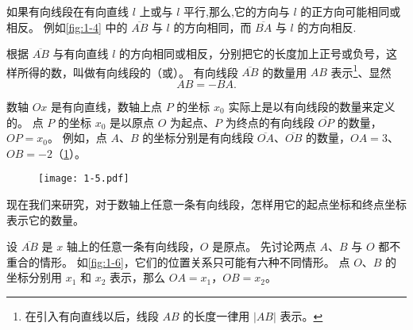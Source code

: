 如果有向线段在有向直线 $l$ 上或与 $l$ 平行,那么,它的方向与 $l$ 的正方向可能相同或相反。
例如\cref{fig:1-4} 中的 $\overline{AB}$ 与 $l$ 的方向相同，而 $\overline{BA}$ 与 $l$ 的方向相反.

根据 $\overline{AB}$ 与有向直线 $l$ 的方向相同或相反，分别把它的长度加上正号或负号，这样所得的数，叫做有向线段的（或）。
有向线段 $\overline{AB}$ 的数量用 $AB$ 表示\footnote{在引入有向直线以后，线段 $AB$ 的长度一律用 $|AB|$ 表示。}、显然
\[AB = - BA.\]

数轴 $Ox$ 是有向直线，数轴上点 $P$ 的坐标 $x_0$ 实际上是以有向线段的数量来定义的。
点 $P$ 的坐标 $x_0$ 是以原点 $O$ 为起点、$P$ 为终点的有向线段 $\overline{OP}$ 的数量，$OP=x_0$。
例如，点 $A$、$B$ 的坐标分别是有向线段 $\overline{OA}$、$\overline{OB}$ 的数量，$OA=3$、$OB=-2$（\cref{fig:1-5}）。
\begin{figure}
    \texttt{[image: 1-5.pdf]}
    \caption{}\label{fig:1-5}
\end{figure}

现在我们来研究，对于数轴上任意一条有向线段，怎样用它的起点坐标和终点坐标表示它的数量。

设 $\overline{AB}$ 是 $x$ 轴上的任意一条有向线段，$O$ 是原点。
先讨论两点 $A$、$B$ 与 $O$ 都不重合的情形。
如\cref{fig:1-6}，它们的位置关系只可能有六种不同情形。
点 $O$、$B$ 的坐标分别用 $x_1$ 和 $x_2$ 表示，那么 $OA=x_1$，$OB=x_2$。

